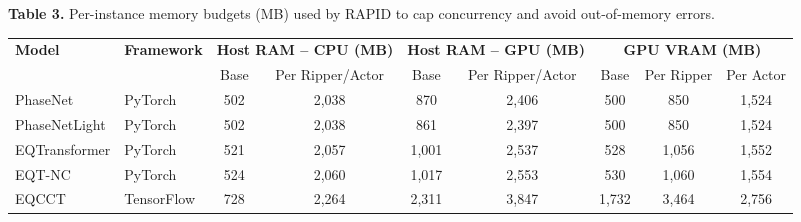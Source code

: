 \clearpage
\begin{landscape}

\begin{center}
\textbf{Table 3.} Per-instance memory budgets (MB) used by RAPID to cap concurrency and avoid out-of-memory errors.

\vspace{1em}
\small
\begin{tabular}{llccccccc}
\toprule
\textbf{Model} & \textbf{Framework} & \multicolumn{2}{c}{\textbf{Host RAM -- CPU (MB)}} & \multicolumn{2}{c}{\textbf{Host RAM -- GPU (MB)}} & \multicolumn{3}{c}{\textbf{GPU VRAM (MB)}} \\
\cmidrule(lr){3-4} \cmidrule(lr){5-6} \cmidrule(lr){7-9}
 & & Base & Per Ripper/Actor & Base & Per Ripper/Actor & Base & Per Ripper & Per Actor \\
\midrule
PhaseNet      & PyTorch    & 502  & 2,038 & 870  & 2,406 & 500  & 850  & 1,524 \\
PhaseNetLight & PyTorch    & 502  & 2,038 & 861  & 2,397 & 500  & 850  & 1,524 \\
EQTransformer & PyTorch    & 521  & 2,057 & 1,001 & 2,537 & 528  & 1,056 & 1,552 \\
EQT-NC        & PyTorch    & 524  & 2,060 & 1,017 & 2,553 & 530  & 1,060 & 1,554 \\
EQCCT         & TensorFlow & 728  & 2,264 & 2,311 & 3,847 & 1,732 & 3,464 & 2,756 \\
\bottomrule
\end{tabular}
\end{center}

\end{landscape}


